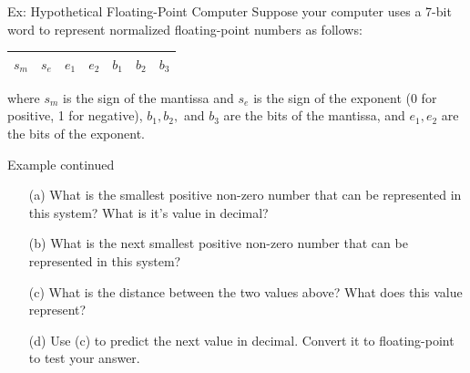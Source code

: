 \documentclass[12pt]{beamer}
\begin{document}
\begin{frame}{Ex: Hypothetical Floating-Point Computer}
Suppose your computer uses a 7-bit word to represent normalized floating-point numbers as follows:

\begin{center}
\begin{tabular}{|c|c|c|c|c|c|c|}
\hline 
$s_m$ & $s_e$ & $e_1$ & $e_2$ & $b_1$ & $b_2$ & $b_3$ \\ 
\hline 
\end{tabular}
\end{center}

where $s_m$ is the sign of the mantissa and  $s_e$ is the sign of the exponent (0 for positive, 1 for negative), 
$b_1,b_2,$ and $b_3$ are the bits of the mantissa, and $e_1,e_2$ are the bits 
of the exponent.
\end{frame}

\begin{frame}{Example continued}
\begin{enumerate}
\item[(a)] What is the smallest positive non-zero number that can be represented in this system? What is it's value in decimal?
\vspace{0.1 in}
\item[(b)] What is the next smallest positive non-zero number that can be represented in this system? 
\vspace{0.1 in}
\item[(c)] What is the distance between the two values above? What does this value represent?
\vspace{0.1 in}
\item[(d)] Use (c) to predict the next value in decimal. Convert it to floating-point to test your answer.
\vspace{0.1 in}
\end{enumerate} 

\end{frame} 
\end{document}
